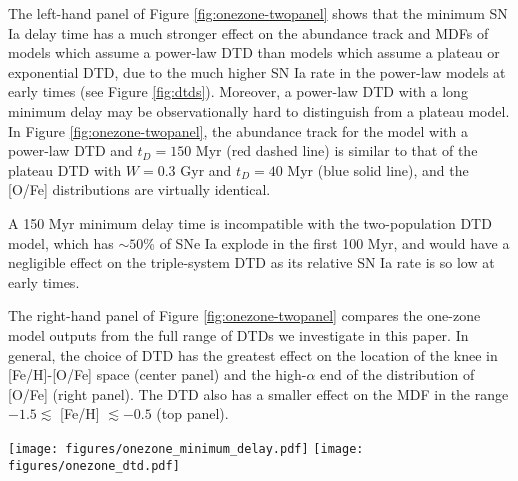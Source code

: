 \documentclass[twocolumn,twocolappendix,linenumbers]{aastex631}
\begin{document}
The left-hand panel of Figure \ref{fig:onezone-twopanel} shows that the minimum SN Ia delay time has a much stronger effect on the abundance track and MDFs of models which assume a power-law DTD than models which assume a plateau or exponential DTD, due to the much higher SN Ia rate in the power-law models at early times (see Figure \ref{fig:dtds}). Moreover, a power-law DTD with a long minimum delay may be observationally hard to distinguish from a plateau model. In Figure \ref{fig:onezone-twopanel}, the abundance track for the model with a power-law DTD and $t_D=150$ Myr (red dashed line) is similar to that of the plateau DTD with $W=0.3$ Gyr and $t_D=40$ Myr (blue solid line), and the [O/Fe] distributions are virtually identical. 

A 150 Myr minimum delay time is incompatible with the two-population DTD model, which has $\sim 50$\% of SNe Ia explode in the first 100 Myr, and would have a negligible effect on the triple-system DTD as its relative SN Ia rate is so low at early times. 

The right-hand panel of Figure \ref{fig:onezone-twopanel} compares the one-zone model outputs from the full range of DTDs we investigate in this paper. In general, the choice of DTD has the greatest effect on the location of the knee in [Fe/H]-[O/Fe] space (center panel) and the high-$\alpha$ end of the distribution of [O/Fe] (right panel). The DTD also has a smaller effect on the MDF in the range $-1.5\lesssim$ [Fe/H] $\lesssim-0.5$ (top panel).

\begin{figure*}
    \centering
    \texttt{[image: figures/onezone\_minimum\_delay.pdf]}
    \texttt{[image: figures/onezone\_dtd.pdf]}
    \caption{\textit{Left:} Comparison of one-zone models with minimum SN Ia delay times of 40 Myr (solid curves) and 150 Myr (dashed curves) for two DTDs: a power-law with $\alpha=-1.1$ (blue curves), and an exponential with $\tau=1.5$ Gyr (purple curves). The layout is similar to the plots in Figure \ref{fig:onezone-threepanel}.
    \textit{Right:} Comparison of one-zone models which assume all five functional forms for the DTD in this paper: triple-system (green), plateau with $W=1$ Gyr (cyan), exponential with $\tau=1.5$ Gyr (purple), power-law with $\alpha=-1.1$ (blue), and two-population (pink). A minimum SN Ia delay time of 40 Myr is assumed for all models.}
    \label{fig:onezone-twopanel}
\end{figure*}
\end{document}
